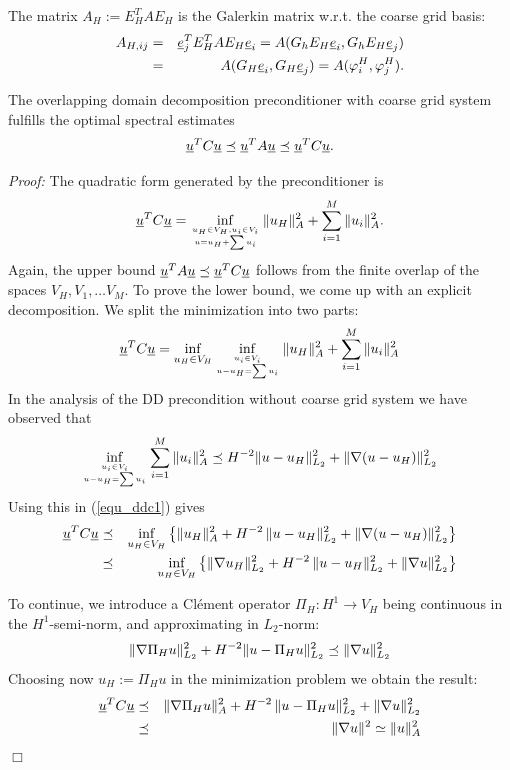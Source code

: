 The matrix $A_H := E_H^T A E_H$ is the Galerkin matrix w.r.t. the coarse grid
basis:
\begin{eqnarray*}
A_{H,ij} & = & \underline e_j^T E_H^T A E_H \underline e_i = A(G_h E_H \underline e_i, G_h E_H \underline e_j) \\
        & = & A(G_H \underline e_i, G_H \underline e_j) = A(\varphi_i^H, \varphi_j^H).
\end{eqnarray*}

\begin{theorem} The overlapping domain decomposition preconditioner with
coarse grid system fulfills the optimal spectral estimates
$$
\underline u^T C \underline u \preceq \underline u^T A \underline u \preceq \underline u^T C \underline u.
$$
\end{theorem}
{\em Proof:} The quadratic form generated by the preconditioner is
$$
\underline u^T C \underline u = \inf_{u_H \in V_H, u_i \in V_i  \atop u = u_H + \sum u_i}
\| u_H \|_A^2 + \sum_{i=1}^M \| u_i \|_A^2.
$$
Again, the upper bound $\underline u^T A \underline u \preceq \underline u^T C \underline u$ follows from
the finite overlap of the spaces $V_H, V_1, \ldots V_M$. To prove the lower
bound, we come up with an explicit decomposition. We split the minimization 
into two parts:
\begin{equation}
\label{equ_ddc1}
\underline u^T C \underline u = \inf_{u_H \in V_H} \inf_{u_i \in V_i  \atop u-u_H = \sum u_i}
\| u_H \|_A^2 + \sum_{i=1}^M \| u_i \|_A^2
\end{equation}
In the analysis of the DD precondition without coarse grid system we have
observed that
$$
\inf_{u_i \in V_i  \atop u-u_H = \sum u_i} \sum_{i=1}^M \| u_i \|_A^2 \preceq
H^{-2} \| u - u_H \|_{L_2}^2 + \| \nabla (u-u_H) \|_{L_2}^2
$$
Using this in (\ref{equ_ddc1}) gives
\begin{eqnarray*}
\underline u^T C \underline u & \preceq & \inf_{u_H \in V_H}  \left\{ \| u_H \|_A^2 + H^{-2} \, \| u - u_H \|_{L_2}^2 + \| \nabla (u - u_H) \|_{L_2}^2 \right\} \\
        & \preceq & \inf_{u_H \in V_H} \left\{ \| \nabla u_H \|_{L_2}^2 + H^{-2} \, \| u - u_H \|_{L_2}^2 + \| \nabla u \|_{L_2}^2 \right\}
\end{eqnarray*}

To continue, we introduce a Cl\'ement operator $\Pi_H : H^1 \rightarrow V_H$
being continuous in the $H^1$-semi-norm, and approximating in $L_2$-norm:
$$
\| \nabla \Pi_H u \|_{L_2}^2 + H^{-2} \| u - \Pi_H u \|_{L_2}^2 \preceq \| \nabla u \|_{L_2}^2
$$
Choosing now $u_H := \Pi_H u$ in the minimization problem we obtain the result:
\begin{eqnarray*}
\underline u^T C \underline u & \preceq & \| \nabla \Pi_H u \|_A^2 + H^{-2} \, \| u - \Pi_H u \|_{L_2}^2 + \| \nabla u \|_{L_2}^2 \\
        & \preceq & \| \nabla u \|^2 \simeq \| u \|_A^2
\end{eqnarray*}
\hfill $\Box$

